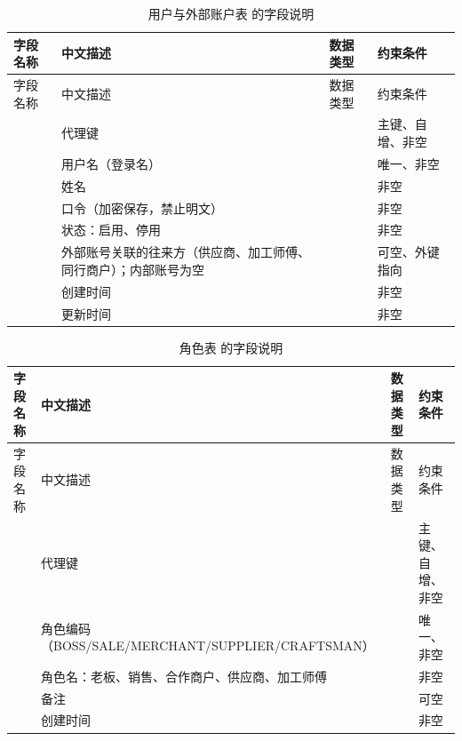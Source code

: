 \begin{longtable}{@{}L{3.5cm} L{4.1cm} L{2.9cm} L{4.0cm}@{}}
\caption{用户与外部账户表  的字段说明}\label{tab:f-t-user}\\
\toprule
字段名称 & 中文描述 & 数据类型 & 约束条件 \\
\midrule
\endfirsthead
\toprule
字段名称 & 中文描述 & 数据类型 & 约束条件 \\
\midrule
\endhead
\bottomrule
\endlastfoot
{} & 代理键 &  & 主键、自增、非空 \\
 & 用户名（登录名） &  & 唯一、非空 \\
 & 姓名 &  & 非空 \\
 & 口令（加密保存，禁止明文） &  & 非空 \\
 & 状态：启用、停用 &  & 非空 \\
 & 外部账号关联的往来方（供应商、加工师傅、同行商户）；内部账号为空 &  & 可空、外键指向  \\
 & 创建时间 &  & 非空 \\
 & 更新时间 &  & 非空 \\
\end{longtable}

\begin{longtable}{@{}L{3.5cm} L{4.1cm} L{2.9cm} L{4.0cm}@{}}
\caption{角色表  的字段说明}\label{tab:f-t-role}\\
\toprule
字段名称 & 中文描述 & 数据类型 & 约束条件 \\
\midrule
\endfirsthead
\toprule
字段名称 & 中文描述 & 数据类型 & 约束条件 \\
\midrule
\endhead
\bottomrule
\endlastfoot
{} & 代理键 &  & 主键、自增、非空 \\
 & 角色编码（BOSS/SALE/MERCHANT/SUPPLIER/CRAFTSMAN） &  & 唯一、非空 \\
 & 角色名：老板、销售、合作商户、供应商、加工师傅 &  & 非空 \\
 & 备注 &  & 可空 \\
 & 创建时间 &  & 非空 \\
\end{longtable}

